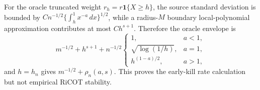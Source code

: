 For the oracle truncated weight \(r_h=r\mathbf 1\{X\ge h\}\), the source standard deviation is bounded by \(Cn^{-1/2}\{\int_h^1x^{-a}\,dx\}^{1/2}\), while a radius-\(M\) boundary local-polynomial approximation contributes at most \(Ch^{s+1}\). Therefore the oracle envelope is \[m^{-1/2}+h^{s+1}+n^{-1/2}\begin{cases}1,&a<1,\\ \sqrt{\log(1/h)},&a=1,\\ h^{(1-a)/2},&a>1,\end{cases}\] and \(h=h_n\) gives \(m^{-1/2}+\rho_n(a,s)\). This proves the early-kill rate calculation but not empirical RiCOT stability.